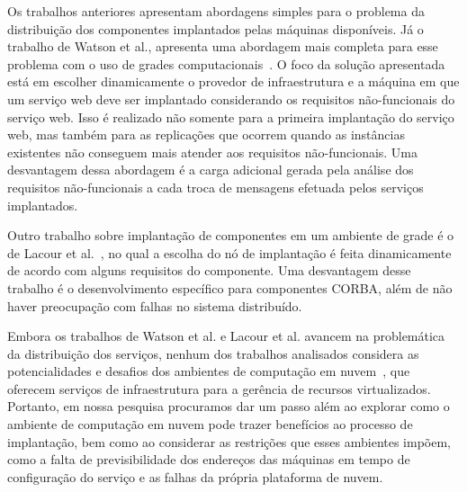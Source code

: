 Os trabalhos anteriores apresentam abordagens simples para o problema da distribuição dos componentes implantados pelas máquinas disponíveis. Já o trabalho de Watson et al., apresenta uma abordagem mais completa para esse problema com o uso de grades computacionais~\cite{Watson2006Dynasoar}. O foco da solução apresentada está em escolher dinamicamente o provedor de infraestrutura e a máquina em que um serviço web deve ser implantado considerando os requisitos não-funcionais do serviço web. Isso é realizado não somente para a primeira implantação do serviço web, mas também para as replicações que ocorrem quando as instâncias existentes não conseguem mais atender aos requisitos não-funcionais. Uma desvantagem dessa abordagem é a carga adicional gerada pela análise dos requisitos não-funcionais a cada troca de mensagens efetuada pelos serviços implantados. 

Outro trabalho sobre implantação de componentes em um ambiente de grade é o de Lacour et al.~\cite{Lacour2004Corba}, no qual a escolha do nó de implantação é feita dinamicamente de acordo com alguns requisitos do componente. Uma desvantagem desse trabalho é o desenvolvimento específico para componentes CORBA, além de não haver preocupação com falhas no sistema distribuído.

Embora os trabalhos de Watson et al. e Lacour et al. avancem na problemática da distribuição dos serviços, nenhum dos trabalhos analisados considera as potencialidades e desafios dos ambientes de computação em nuvem~\cite{Amazon2012Practices}, que oferecem serviços de infraestrutura para a gerência de recursos virtualizados. Portanto, em nossa pesquisa procuramos dar um passo além ao explorar como o ambiente de computação em nuvem pode trazer benefícios ao processo de implantação, bem como ao considerar as restrições que esses ambientes impõem, como a falta de previsibilidade dos endereços das máquinas em tempo de configuração do serviço e as falhas da própria plataforma de nuvem.

